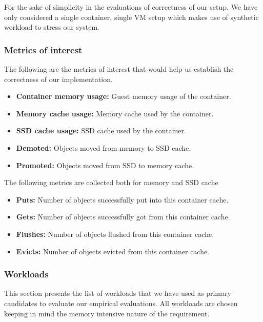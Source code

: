 	  For the sake of simplicity in the evaluations of correctness of our setup. We have only considered a single container, single VM setup 
	  which makes use of synthetic workload to stress our system.
	
      \subsubsection{Metrics of interest}	
	The following are the metrics of interest that would help us establish the correctness of our implementation.
	  
	  \begin{itemize}
	   
	   \item \textbf{Container memory usage:} Guest memory usage of the container.
	   \item \textbf{Memory cache usage:} Memory cache used by the container.
	   \item \textbf{SSD cache usage:} SSD cache used by the container.
	   
	   \item \textbf{Demoted:} Objects moved from memory to SSD cache.
	   \item \textbf{Promoted:} Objects moved from SSD to memory cache.
	   
	  \end{itemize}	  
	  
	  The following metrics are collected both for memory and SSD cache
	  
	  \begin{itemize}
	   
	   \item \textbf{Puts:} Number of objects successfully put into this container cache.
	   \item \textbf{Gets:} Number of objects successfully got from this container cache.
	   \item \textbf{Flushes:} Number of objects flushed from this container cache.
	   \item \textbf{Evicts:} Number of objects evicted from this container cache.
	   
	  \end{itemize}
    
      \subsubsection{Workloads}
      
	This section presents the list of workloads that we have used as primary candidates to evaluate our empirical evaluations. All 
    workloads are chosen keeping in mind the memory intensive nature of the requirement.  
	
